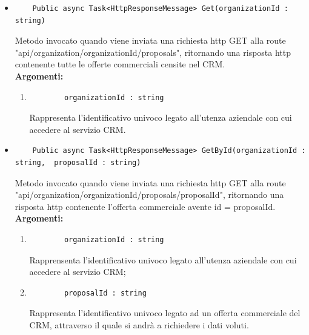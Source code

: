 \begin{itemize}
	\itemsep0em 
	\item 
	\begin{lstlisting}
	Public async Task<HttpResponseMessage> Get(organizationId : string)
	\end{lstlisting}
	Metodo invocato quando viene inviata una richiesta http GET alla route "api/organization/{organizationId}/proposals", ritornando una risposta http contenente tutte le offerte commerciali censite nel CRM.\\
	\textbf{\small Argomenti:}
	\begin{enumerate}[leftmargin=*]
		\itemsep0em 
		\item \begin{lstlisting}
		organizationId : string 
		\end{lstlisting}
		Rappresenta l'identificativo univoco legato all'utenza aziendale con cui accedere al servizio CRM.
	\end{enumerate}
	
	\item 
	\begin{lstlisting}
	Public async Task<HttpResponseMessage> GetById(organizationId : string,  proposalId : string)
	\end{lstlisting}
	Metodo invocato quando viene inviata una richiesta http GET alla route "api/organization/{organizationId}/proposals/{proposalId}", ritornando una risposta http contenente l'offerta commerciale avente id = {proposalId}.\\
	\textbf{\small Argomenti:}
	\begin{enumerate}[leftmargin=*]
		\itemsep0em 
		\item 
		\begin{lstlisting}
		organizationId : string 
		\end{lstlisting}
		Rapprensenta l'identificativo univoco legato all'utenza aziendale con cui accedere al servizio CRM;
		\item 
		\begin{lstlisting}
		proposalId : string
		\end{lstlisting}
		Rappresenta l'identificativo univoco legato ad un offerta commerciale del CRM, attraverso il quale si andrà a richiedere i dati voluti.
	\end{enumerate}


\end{itemize}
